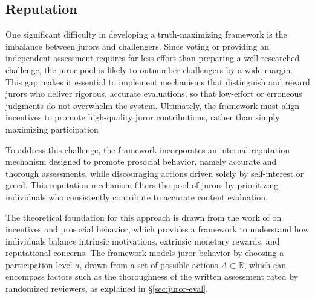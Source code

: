 \documentclass{article}
\begin{document}
\subsection{Reputation}


One significant difficulty in developing a truth-maximizing framework is the imbalance between jurors and challengers. Since voting or providing an independent assessment requires far less effort than preparing a well-researched challenge, the juror pool is likely to outnumber challengers by a wide margin. This gap makes it essential to implement mechanisms that distinguish and reward jurors who deliver rigorous, accurate evaluations, so that low-effort or erroneous judgments do not overwhelm the system. Ultimately, the framework must align incentives to promote high-quality juror contributions, rather than simply maximizing participation

To address this challenge, the framework incorporates an internal reputation mechanism designed to promote prosocial behavior, namely accurate and thorough assessments, while discouraging actions driven solely by self-interest or greed. This reputation mechanism filters the pool of jurors by prioritizing individuals who consistently contribute to accurate content evaluation.

The theoretical foundation for this approach is drawn from the work of \textcite{bnabou2006} on incentives and prosocial behavior, which provides a framework to understand how individuals balance intrinsic motivations, extrinsic monetary rewards, and reputational concerns. The framework models juror behavior by choosing a participation level $a$, drawn from a set of possible actions $A \subset \mathbb{R}$, which can encompass factors such as the thoroughness of the written assessment rated by randomized reviewers, as explained in \S\ref{sec:juror-eval}.
\end{document}
